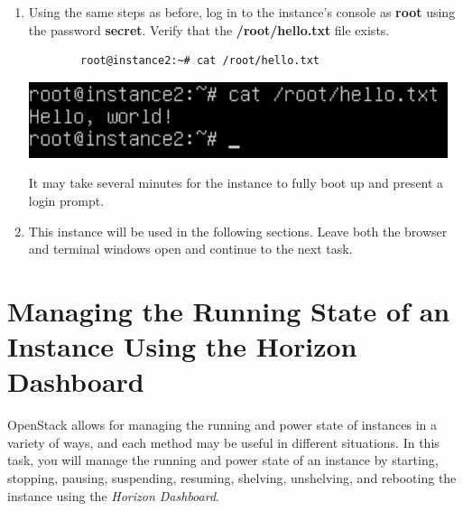 \documentclass[letterpaper, 12pt]{article}
\begin{document}
\begin{enumerate}
    \item Using the same steps as before, log in to the instance's console as \textbf{root} using the password \textbf{secret}.
    Verify that the \textbf{/root/hello.txt} file exists.
    \begin{lstlisting}
        root@instance2:~# cat /root/hello.txt
    \end{lstlisting}

    \begin{center}
        \includegraphics[width=\linewidth]{images/part2/step15.png}
    \end{center}

    \begin{notebox}
        It may take several minutes for the instance to fully boot up and present a login prompt.
    \end{notebox}

    \item This instance will be used in the following sections.
    Leave both the browser and terminal windows open and continue to the next task.

\end{enumerate}


\section{Managing the Running State of an Instance Using the Horizon Dashboard}
\label{sec:managing_the_running_state_of_an_instance_web}
OpenStack allows for managing the running and power state of instances in a variety of ways, and each method may be useful in different situations.
In this task, you will manage the running and power state of an instance by starting, stopping, pausing, suspending, resuming, shelving, unshelving, and rebooting the instance using the \textit{Horizon Dashboard}.
\end{document}
